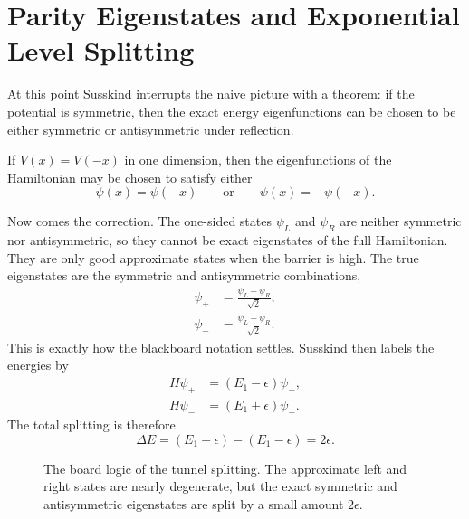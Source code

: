 \section{Parity Eigenstates and Exponential Level Splitting}

At this point Susskind interrupts the naive picture with a theorem: if the potential is symmetric, then the exact energy eigenfunctions can be chosen to be either symmetric or antisymmetric under reflection.

\begin{theorem}
If \(V(x)=V(-x)\) in one dimension, then the eigenfunctions of the Hamiltonian may be chosen to satisfy either
\[
\psi(x)=\psi(-x)
\qquad \text{or} \qquad
\psi(x)=-\psi(-x).
\]
\end{theorem}

Now comes the correction. The one-sided states \(\psi_L\) and \(\psi_R\) are neither symmetric nor antisymmetric, so they cannot be exact eigenstates of the full Hamiltonian. They are only good approximate states when the barrier is high. The true eigenstates are the symmetric and antisymmetric combinations,
\begin{align}
\psi_+ &= \frac{\psi_L+\psi_R}{\sqrt{2}},\\
\psi_- &= \frac{\psi_L-\psi_R}{\sqrt{2}}.
\end{align}
This is exactly how the blackboard notation settles. Susskind then labels the energies by
\begin{align}
H\psi_+ &= (E_1-\epsilon)\psi_+,\\
H\psi_- &= (E_1+\epsilon)\psi_-.
\end{align}
The total splitting is therefore
\begin{equation}
\Delta E = (E_1+\epsilon)-(E_1-\epsilon)=2\epsilon .
\end{equation}

\begin{figure}
\centering
{}
\caption{The board logic of the tunnel splitting. The approximate left and right states are nearly degenerate, but the exact symmetric and antisymmetric eigenstates are split by a small amount \(2\epsilon\).}
\end{figure}


